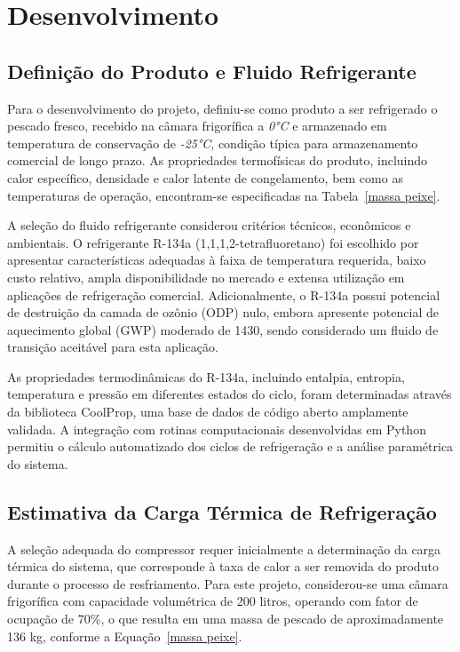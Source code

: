 \chapter{Desenvolvimento}

\section{Definição do Produto e Fluido Refrigerante}

Para o desenvolvimento do projeto, definiu-se como produto a ser refrigerado o pescado fresco, recebido na câmara frigorífica a \textit{0°C} e armazenado em temperatura de conservação de \textit{-25°C}, condição típica para armazenamento comercial de longo prazo. As propriedades termofísicas do produto, incluindo calor específico, densidade e calor latente de congelamento, bem como as temperaturas de operação, encontram-se especificadas na Tabela~\ref{massa peixe}.

A seleção do fluido refrigerante considerou critérios técnicos, econômicos e ambientais. O refrigerante R-134a (1,1,1,2-tetrafluoretano) foi escolhido por apresentar características adequadas à faixa de temperatura requerida, baixo custo relativo, ampla disponibilidade no mercado e extensa utilização em aplicações de refrigeração comercial. Adicionalmente, o R-134a possui potencial de destruição da camada de ozônio (ODP) nulo, embora apresente potencial de aquecimento global (GWP) moderado de 1430, sendo considerado um fluido de transição aceitável para esta aplicação.

As propriedades termodinâmicas do R-134a, incluindo entalpia, entropia, temperatura e pressão em diferentes estados do ciclo, foram determinadas através da biblioteca CoolProp, uma base de dados de código aberto amplamente validada. A integração com rotinas computacionais desenvolvidas em Python permitiu o cálculo automatizado dos ciclos de refrigeração e a análise paramétrica do sistema.

\section{Estimativa da Carga Térmica de Refrigeração}

A seleção adequada do compressor requer inicialmente a determinação da carga térmica do sistema, que corresponde à taxa de calor a ser removida do produto durante o processo de resfriamento. Para este projeto, considerou-se uma câmara frigorífica com capacidade volumétrica de 200 litros, operando com fator de ocupação de 70\%, o que resulta em uma massa de pescado de aproximadamente 136 kg, conforme a Equação~\ref{massa peixe}.


